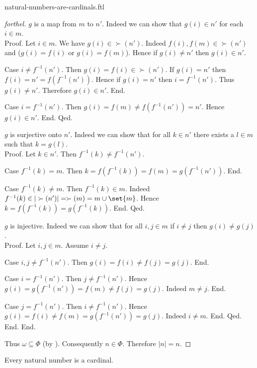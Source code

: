 \documentclass{naproche-library}
\begin{document}
\begin{smodule}{natural-numbers-are-cardinals.ftl}
\begin{proof}[forthel]
        $g$ is a map from $m$ to $n'$.
        Indeed we can show that $g(i) \in n'$ for each $i \in m$. \\
        Proof.
          Let $i \in m$.
          We have $g(i) \in \succ(n')$.
          Indeed $f(i), f(m) \in \succ(n')$ and ($g(i) = f(i)$ or $g(i) = f(m)$).
          Hence if $g(i) \neq n'$ then $g(i) \in n'$.

          Case $i \neq f^{-1}(n')$.
            Then $g(i) = f(i) \in \succ(n')$.
            If $g(i) = n'$ then $f(i) = n' = f(f^{-1}(n'))$.
            Hence if $g(i) = n'$ then $i = f^{-1}(n')$.
            Thus $g(i) \neq n'$.
            Therefore $g(i) \in n'$.
          End.

          Case $i = f^{-1}(n')$.
            Then $g(i)
              = f(m)
              \neq f(f^{-1}(n'))
              = n'$.
            Hence $g(i) \in n'$.
          End.
        Qed.

        $g$ is surjective onto $n'$.
        Indeed we can show that for all $k \in n'$ there exists a $l \in m$ such that $k = g(l)$. \\
        Proof.
          Let $k \in n'$.
          Then $f^{-1}(k) \neq f^{-1}(n')$.

          Case $f^{-1}(k) = m$.
            Then $k
              = f(f^{-1}(k))
              = f(m)
              = g(f^{-1}(n'))$.
          End.

          Case $f^{-1}(k) \neq m$.
            Then $f^{-1}(k) \in m$.
            Indeed $f^{-1}(k) \in |\succ(n')| = \succ(m) = m \cup \set{m}$.
            Hence $k
              = f(f^{-1}(k))
              = g(f^{-1}(k))$.
          End.
        Qed.

        $g$ is injective.
        Indeed we can show that for all $i, j \in m$ if $i \neq j$ then $g(i) \neq g(j)$. \\
        Proof.
          Let $i, j \in m$.
          Assume $i \neq j$.

          Case $i, j \neq f^{-1}(n')$.
            Then $g(i)
              = f(i)
              \neq f(j)
              = g(j)$.
          End.

          Case $i = f^{-1}(n')$.
            Then $j \neq f^{-1}(n')$.
            Hence $g(i)
              = g(f^{-1}(n'))
              = f(m)
              \neq f(j)
              = g(j)$.
            Indeed $m \neq j$.
          End.

          Case $j = f^{-1}(n')$.
            Then $i \neq f^{-1}(n')$.
            Hence $g(i)
              = f(i)
              \neq f(m)
              = g(f^{-1}(n'))
              = g(j)$.
            Indeed $i \neq m$.
          End.
        Qed.
      End.
    End.

    Thus $\omega \subseteq \Phi$ (by ).
    Consequently $n \in \Phi$.
    Therefore $|n| = n$.
  \end{proof}

  \begin{corollary}[forthel,id=SET_THEORY_07_7061392098066432]
    Every natural number is a cardinal.
  \end{corollary}
\end{smodule}
\end{document}
